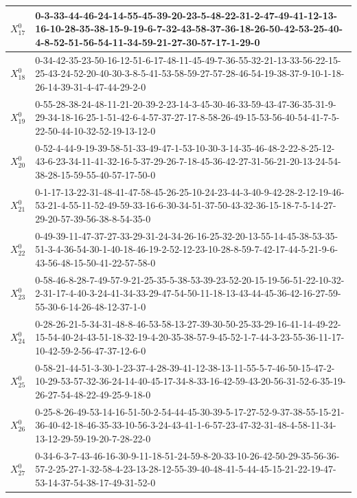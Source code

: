 \begin{landscape}
{\begin{tabularx}{\linewidth}{|c|X|}
        $X_{17}^{0}$ & 0-3-33-44-46-24-14-55-45-39-20-23-5-48-22-31-2-47-49-41-12-13-16-10-28-35-38-15-9-19-6-7-32-43-58-37-36-18-26-50-42-53-25-40-4-8-52-51-56-54-11-34-59-21-27-30-57-17-1-29-0 \\ \hline
        $X_{18}^{0}$ & 0-34-42-35-23-50-16-12-51-6-17-48-11-45-49-7-36-55-32-21-13-33-56-22-15-25-43-24-52-20-40-30-3-8-5-41-53-58-59-27-57-28-46-54-19-38-37-9-10-1-18-26-14-39-31-4-47-44-29-2-0 \\ \hline
        $X_{19}^{0}$ & 0-55-28-38-24-48-11-21-20-39-2-23-14-3-45-30-46-33-59-43-47-36-35-31-9-29-34-18-16-25-1-51-42-6-4-57-37-27-17-8-58-26-49-15-53-56-40-54-41-7-5-22-50-44-10-32-52-19-13-12-0 \\ \hline
        $X_{20}^{0}$ & 0-52-4-44-9-19-39-58-51-33-49-47-1-53-10-30-3-14-35-46-48-2-22-8-25-12-43-6-23-34-11-41-32-16-5-37-29-26-7-18-45-36-42-27-31-56-21-20-13-24-54-38-28-15-59-55-40-57-17-50-0 \\ \hline
        $X_{21}^{0}$ & 0-1-17-13-22-31-48-41-47-58-45-26-25-10-24-23-44-3-40-9-42-28-2-12-19-46-53-21-4-55-11-52-49-59-33-16-6-30-34-51-37-50-43-32-36-15-18-7-5-14-27-29-20-57-39-56-38-8-54-35-0 \\ \hline
        $X_{22}^{0}$ & 0-49-39-11-47-37-27-33-29-31-24-34-26-16-25-32-20-13-55-14-45-38-53-35-51-3-4-36-54-30-1-40-18-46-19-2-52-12-23-10-28-8-59-7-42-17-44-5-21-9-6-43-56-48-15-50-41-22-57-58-0 \\ \hline
        $X_{23}^{0}$ & 0-58-46-8-28-7-49-57-9-21-25-35-5-38-53-39-23-52-20-15-19-56-51-22-10-32-2-31-17-4-40-3-24-41-34-33-29-47-54-50-11-18-13-43-44-45-36-42-16-27-59-55-30-6-14-26-48-12-37-1-0 \\ \hline
        $X_{24}^{0}$ & 0-28-26-21-5-34-31-48-8-46-53-58-13-27-39-30-50-25-33-29-16-41-14-49-22-15-54-40-24-43-51-18-32-19-4-20-35-38-57-9-45-52-1-7-44-3-23-55-36-11-17-10-42-59-2-56-47-37-12-6-0 \\ \hline
        $X_{25}^{0}$ & 0-58-21-44-51-3-30-1-23-37-4-28-39-41-12-38-13-11-55-5-7-46-50-15-47-2-10-29-53-57-32-36-24-14-40-45-17-34-8-33-16-42-59-43-20-56-31-52-6-35-19-26-27-54-48-22-49-25-9-18-0 \\ \hline
        $X_{26}^{0}$ & 0-25-8-26-49-53-14-16-51-50-2-54-44-45-30-39-5-17-27-52-9-37-38-55-15-21-36-40-42-18-46-35-33-10-56-3-24-43-41-1-6-57-23-47-32-31-48-4-58-11-34-13-12-29-59-19-20-7-28-22-0 \\ \hline
        $X_{27}^{0}$ & 0-34-6-3-7-43-46-16-30-9-11-18-51-24-59-8-20-33-10-26-42-50-29-35-56-36-57-2-25-27-1-32-58-4-23-13-28-12-55-39-40-48-41-5-44-45-15-21-22-19-47-53-14-37-54-38-17-49-31-52-0 \\ \hline

\end{tabularx}}
\end{landscape}
